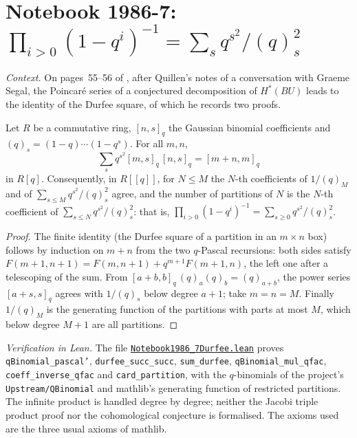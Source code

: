 \section[Notebook 1986-7: the Durfee identity]{Notebook 1986-7: $\prod_{i>0}(1 - q^i)^{-1} = \sum_s q^{s^2}/(q)_s^2$\protect{}}\label{sec:quillen-1986-7-durfee}

\emph{Context.} On pages~55--56 of , after Quillen's notes of a conversation with Graeme Segal, the Poincaré series of a conjectured decomposition of $H^*(BU)$ leads to the identity of the Durfee square, of which he records two proofs.

\begin{encadre}
\begin{theoreme}\label{thm:quillen-1986-7-durfee}
Let $R$ be a commutative ring, $[n, s]_q$ the Gaussian binomial coefficients and $(q)_s = (1 - q)\cdots(1 - q^s)$. For all $m, n$,
\[
\sum_{s} q^{s^2}[m, s]_q\,[n, s]_q = [m + n, m]_q
\]
in $R[q]$. Consequently, in $R[[q]]$, for $N \le M$ the $N$-th coefficients of $1/(q)_M$ and of $\sum_{s\le M} q^{s^2}/(q)_s^2$ agree, and the number of partitions of $N$ is the $N$-th coefficient of $\sum_{s \le N} q^{s^2}/(q)_s^2$: that is, $\prod_{i>0}(1 - q^i)^{-1} = \sum_{s \ge 0} q^{s^2}/(q)_s^2$.
\end{theoreme}
\end{encadre}

\begin{proof}
The finite identity (the Durfee square of a partition in an $m \times n$ box) follows by induction on $m + n$ from the two $q$-Pascal recursions: both sides satisfy $F(m + 1, n + 1) = F(m, n + 1) + q^{m+1}F(m + 1, n)$, the left one after a telescoping of the sum. From $[a + b, b]_q\,(q)_a(q)_b = (q)_{a+b}$, the power series $[a + s, s]_q$ agrees with $1/(q)_s$ below degree $a + 1$; take $m = n = M$. Finally $1/(q)_M$ is the generating function of the partitions with parts at most $M$, which below degree $M + 1$ are all partitions.
\end{proof}

{\raggedright \emph{Verification in Lean.} The file \href{\leanblobmain/Notebook1986_7Durfee.lean}{\texttt{Notebook1986\_7Durfee.\allowbreak{}lean}} proves \texttt{qBinomial\_pascal'}, \texttt{durfee\_succ\_succ}, \texttt{sum\_durfee}, \texttt{qBinomial\_mul\_qfac}, \texttt{coeff\_inverse\_qfac} and \texttt{card\_partition}, with the $q$-binomials of the project's \texttt{Upstream/QBinomial} and mathlib's generating function of restricted partitions. The infinite product is handled degree by degree; neither the Jacobi triple product proof nor the cohomological conjecture is formalised. The axioms used are the three usual axioms of mathlib.\par}

